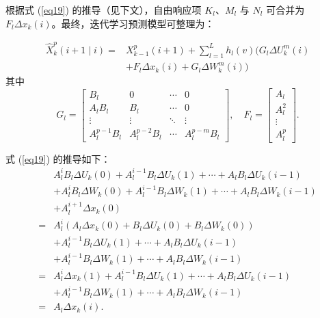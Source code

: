 根据式 (\ref{eq19}) 的推导（见下文），自由响应项 $K_l$、$M_l$ 与 $N_l$ 可合并为 $F_l \Delta x_k(i)$。最终，迭代学习预测模型可整理为：

\begin{equation}
\begin{aligned}
\hat{X}_k^p(i+1 \mid i) = {}& X_{k-1}^p(i+1) + \sum_{l=1}^{L} h_l(v) \bigl( G_l \Delta U_k^m(i) \\
& + F_l \Delta x_k(i) + G_l \Delta W_k^m(i) \bigr)
\end{aligned}
\label{eq20}
\end{equation}
其中
\begin{equation*}
G_l = 
\begin{bmatrix}
B_l & 0 & \cdots & 0 \\
A_l B_l & B_l & \cdots & 0 \\
\vdots & \vdots & \ddots & \vdots \\
A_l^{p-1} B_l & A_l^{p-2} B_l & \cdots & A_l^{p-m} B_l
\end{bmatrix},
\quad
F_l = 
\begin{bmatrix}
A_l \\ 
A_l^2 \\ 
\vdots \\
A_l^p
\end{bmatrix}.
\end{equation*}

式 (\ref{eq19}) 的推导如下：
\begin{equation}
\begin{aligned}
& A_l^i B_l \Delta U_k(0)+A_l^{i-1} B_l \Delta U_k(1)+\cdots+A_l B_l \Delta U_k(i-1) \\
& + A_l^i B_l \Delta W_k(0)+ A_l^{i-1} B_l \Delta W_k(1)+ \cdots+A_l B_l \Delta W_k(i-1) \\
& + A_l^{i+1} \Delta x_k(0) \\
= & A_l^i\left(A_l \Delta x_k(0)+B_l \Delta U_k(0)+B_l \Delta W_k(0)\right) \\
& + A_l^{i-1} B_l \Delta U_k(1)+\cdots+A_l B_l \Delta U_k(i-1) \\
& + A_l^{i-1} B_l \Delta W_k(1)+ \cdots+A_l B_l \Delta W_k(i-1) \\
= & A_l^i \Delta x_k(1) + A_l^{i-1} B_l \Delta U_k(1) + \cdots + A_l B_l \Delta U_k(i-1) \\
& + A_l^{i-1} B_l \Delta W_k(1) + \cdots + A_l B_l \Delta W_k(i-1) \\
= & A_l \Delta x_k(i).
\end{aligned}
\label{eq19}
\end{equation}

